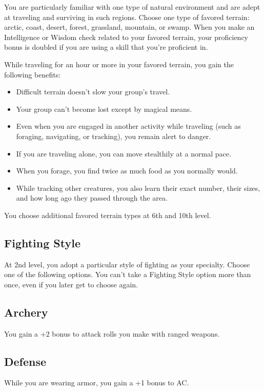 You are particularly familiar with one type of natural environment and are adept at traveling and surviving in such regions. Choose one type of favored terrain: arctic, coast, desert, forest, grassland, mountain, or swamp. When you make an Intelligence or Wisdom check related to your favored terrain, your proficiency bonus is doubled if you are using a skill that you're proficient in.

While traveling for an hour or more in your favored terrain, you gain the following benefits:
\begin{itemize}
\item Difficult terrain doesn't slow your group's travel.
\item Your group can't become lost except by magical means.
\item Even when you are engaged in another activity while traveling (such as foraging, navigating, or tracking), you remain alert to danger.
\item If you are traveling alone, you can move stealthily at a normal pace.
\item When you forage, you find twice as much food as you normally would.
\item While tracking other creatures, you also learn their exact number, their sizes, and how long ago they passed through the area.
\end{itemize}

You choose additional favored terrain types at 6th and 10th level.

\subsection{Fighting Style}

At 2nd level, you adopt a particular style of fighting as your specialty. Choose one of the following options. You can't take a Fighting Style option more than once, even if you later get to choose again.

\subsection{Archery}

You gain a +2 bonus to attack rolls you make with ranged weapons.

\subsection{Defense}

While you are wearing armor, you gain a +1 bonus to AC.

